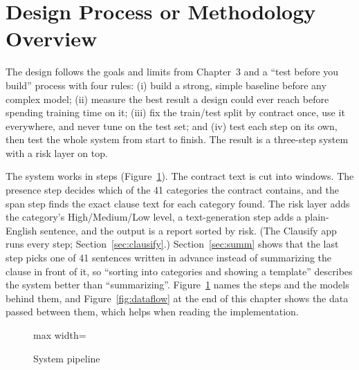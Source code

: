 \section{Design Process or Methodology Overview}
The design follows the goals and limits from Chapter~3 and a ``test before you build'' process with four rules: (i) build a strong, simple baseline before any complex model; (ii) measure the best result a design could ever reach before spending training time on it; (iii) fix the train/test split by contract once, use it everywhere, and never tune on the test set; and (iv) test each step on its own, then test the whole system from start to finish. The result is a three-step system with a risk layer on top.

The system works in steps (Figure~\ref{fig:pipeline}). The contract text is cut into windows. The presence step decides which of the 41 categories the contract contains, and the span step finds the exact clause text for each category found. The risk layer adds the category's High\slash Medium\slash Low level, a text-generation step adds a plain-English sentence, and the output is a report sorted by risk. (The Clausify app runs every step; Section~\ref{sec:clausify}.) Section~\ref{sec:summ} shows that the last step picks one of 41 sentences written in advance instead of summarizing the clause in front of it, so ``sorting into categories and showing a template'' describes the system better than ``summarizing''. Figure~\ref{fig:pipeline} names the steps and the models behind them, and Figure~\ref{fig:dataflow} at the end of this chapter shows the data passed between them, which helps when reading the implementation.

\begin{figure}[ht]
\centering
\begin{adjustbox}{max width=\textwidth}
\end{adjustbox}
\caption{System pipeline}
\label{fig:pipeline}
\end{figure}

